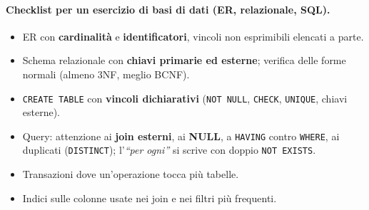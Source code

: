 \paragraph{Checklist per un esercizio di basi di dati (ER, relazionale, SQL).}
\begin{itemize}
    \item ER con \textbf{cardinalità} e \textbf{identificatori}, vincoli non esprimibili elencati a parte.
    \item Schema relazionale con \textbf{chiavi primarie ed esterne}; verifica delle forme normali (almeno 3NF, meglio BCNF).
    \item \texttt{CREATE TABLE} con \textbf{vincoli dichiarativi} (\texttt{NOT NULL}, \texttt{CHECK}, \texttt{UNIQUE}, chiavi esterne).
    \item Query: attenzione ai \textbf{join esterni}, ai \textbf{NULL}, a \texttt{HAVING} contro \texttt{WHERE}, ai duplicati (\texttt{DISTINCT}); l'\emph{``per ogni''} si scrive con doppio \texttt{NOT EXISTS}.
    \item Transazioni dove un'operazione tocca più tabelle.
    \item Indici sulle colonne usate nei join e nei filtri più frequenti.
\end{itemize}
